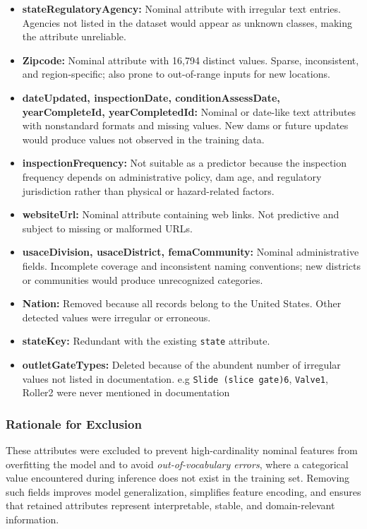 \documentclass{article}
\begin{document}
\begin{itemize}
    \item \textbf{stateRegulatoryAgency:} Nominal attribute with irregular text entries. Agencies not listed in the dataset would appear as unknown classes, making the attribute unreliable.
    \item \textbf{Zipcode:} Nominal attribute with 16,794 distinct values. Sparse, inconsistent, and region-specific; also prone to out-of-range inputs for new locations.
    \item \textbf{dateUpdated, inspectionDate, conditionAssessDate, yearCompleteId, yearCompletedId:} Nominal or date-like text attributes with nonstandard formats and missing values. New dams or future updates would produce values not observed in the training data.
    \item \textbf{inspectionFrequency:} Not suitable as a predictor because the inspection frequency depends on administrative policy, dam age, and regulatory jurisdiction rather than physical or hazard-related factors.
    \item \textbf{websiteUrl:} Nominal attribute containing web links. Not predictive and subject to missing or malformed URLs.
    \item \textbf{usaceDivision, usaceDistrict, femaCommunity:} Nominal administrative fields. Incomplete coverage and inconsistent naming conventions; new districts or communities would produce unrecognized categories.
    \item \textbf{Nation:} Removed because all records belong to the United States. Other detected values were irregular or erroneous.
    \item \textbf{stateKey:} Redundant with the existing \texttt{state} attribute.
    \item \textbf{outletGateTypes:} Deleted because of the abundent number of irregular values not listed in documentation. e.g \verb|Slide (slice gate)6|, \verb|Valve1|, Roller2 were never mentioned in documentation
\end{itemize}

\subsubsection*{Rationale for Exclusion}

These attributes were excluded to prevent high-cardinality nominal features from overfitting the model and to avoid \textit{out-of-vocabulary errors}, where a categorical value encountered during inference does not exist in the training set. Removing such fields improves model generalization, simplifies feature encoding, and ensures that retained attributes represent interpretable, stable, and domain-relevant information.
\end{document}
